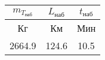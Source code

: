 \begin{tabular}{|c|c|c|}
\hline
$m_{T_{наб}}$ & $L_{наб}$ & $t_{наб}$ \\ 
\hline
Кг & Км & Мин \\ 
\hline
2664.9 & 124.6 & 10.5 \\ 
\hline
\end{tabular}